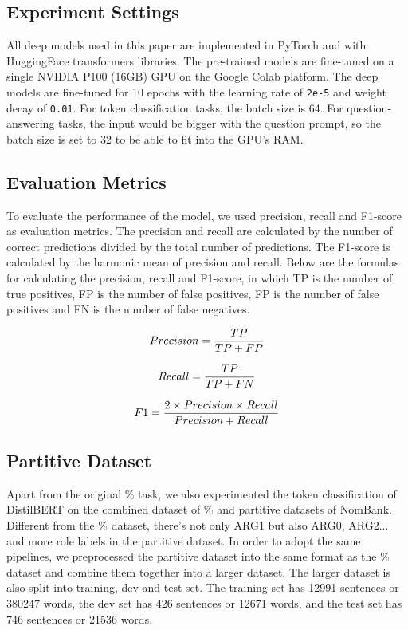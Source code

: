 \documentclass[11pt]{article}
\begin{document}
\subsection{Experiment Settings}

All deep models used in this paper are implemented in PyTorch and with HuggingFace transformers libraries. The pre-trained models are fine-tuned on a single NVIDIA P100 (16GB) GPU on the Google Colab platform. The deep models are fine-tuned for 10 epochs with the learning rate of \verb|2e-5| and weight decay of \verb|0.01|. For token classification tasks, the batch size is 64. For question-answering tasks, the input would be bigger with the question prompt, so the batch size is set to 32 to be able to fit into the GPU's RAM.

\subsection{Evaluation Metrics}

To evaluate the performance of the model, we used precision, recall and F1-score as evaluation metrics. The precision and recall are calculated by the number of correct predictions divided by the total number of predictions. The F1-score is calculated by the harmonic mean of precision and recall. Below are the formulas for calculating the precision, recall and F1-score, in which TP is the number of true positives, FP is the number of false positives, FP is the number of false positives and FN is the number of false negatives.

\begin{equation}
  Precision={TP\over{TP+FP}}
\end{equation}

\begin{equation}
  Recall={TP\over{TP+FN}}
\end{equation}

\begin{equation}
  F1={2\times{Precision}\times{Recall}\over{Precision+Recall}}
\end{equation}

\subsection{Partitive Dataset}

Apart from the original \% task, we also experimented the token classification of DistilBERT on the combined dataset of \% and partitive datasets of NomBank. Different from the \% dataset, there's not only ARG1 but also ARG0, ARG2... and more role labels in the partitive dataset. In order to adopt the same pipelines, we preprocessed the partitive dataset into the same format as the \% dataset and combine them together into a larger dataset. The larger dataset is also split into training, dev and test set. The training set has 12991 sentences or 380247 words, the dev set has 426 sentences or 12671 words, and the test set has 746 sentences or 21536 words.
\end{document}
